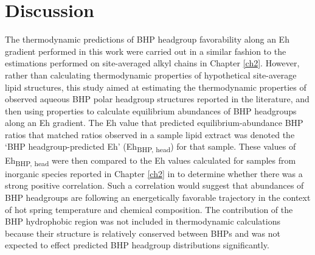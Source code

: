 

\section{Discussion}

The thermodynamic predictions of BHP headgroup favorability along an Eh gradient performed in this work were carried out in a similar fashion to the estimations performed on site-averaged alkyl chains in Chapter \ref{ch2}. However, rather than calculating thermodynamic properties of hypothetical site-average lipid structures, this study aimed at estimating the thermodynamic properties of observed aqueous BHP polar headgroup structures reported in the literature, and then using properties to calculate equilibrium abundances of BHP headgroups along an Eh gradient. The Eh value that predicted equilibrium-abundance BHP ratios that matched ratios observed in a sample lipid extract was denoted the `BHP headgroup-predicted Eh' (Eh\textsubscript{BHP, head}) for that sample. These values of Eh\textsubscript{BHP, head} were then compared to the Eh values calculated for samples from inorganic species reported in Chapter \ref{ch2} in to determine whether there was a strong positive correlation. Such a correlation would suggest that abundances of BHP headgroups are following an energetically favorable trajectory in the context of hot spring temperature and chemical composition. The contribution of the BHP hydrophobic region was not included in thermodynamic calculations because their structure is relatively conserved between BHPs and was not expected to effect predicted BHP headgroup distributions significantly.


